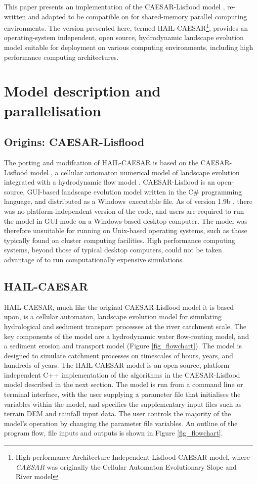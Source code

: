 This paper presents an implementation of the CAESAR-Lisflood model \citep{Coulthard2013}, re-written and adapted to be compatible on for shared-memory parallel computing environments. The version presented here, termed HAIL-CAESAR\footnote{High-performance Architecture Independent Lisflood-CAESAR model, where \textit{CAESAR} was originally the Cellular Automaton Evolutionary Slope and River model}, provides an operating-system independent, open source, hydrodynamic landscape evolution model suitable for deployment on various computing environments, including high performance computing architectures.


\section{Model description and parallelisation}

\subsection{Origins: CAESAR-Lisflood}
The porting and modifcation of HAIL-CAESAR is based on the CAESAR-Lisflood model \citep{Coulthard2013}, a cellular automaton numerical model of landscape evolution integrated with a hydrodynamic flow model \citep{bates2010simple}. CAESAR-Lisflood is an open-source, GUI-based landscape evolution model written in the C\# programming language, and distributed as a  Windows\texttrademark  \ executable file. As of version 1.9b \citep{coulthard2017caesarlisflood}, there was no platform-independent version of the code, and users are required to run the model in GUI-mode on a Windows-based desktop computer. The model was therefore unsuitable for running on Unix-based operating systems, such as those typically found on cluster computing facilities. High performance computing systems, beyond those of typical desktop computers, could not be taken advantage of to run computationally expensive simulations. 

\subsection{HAIL-CAESAR}

HAIL-CAESAR, much like the original CAESAR-Lisflood model it is based upon, is a cellular automaton, landscape evolution model for simulating hydrological and sediment transport processes at the river catchment scale. The key components of the model are a hydrodynamic water flow-routing model, and a sediment erosion and transport model (Figure \ref{fig_flowchart}). The model is designed to simulate catchment processes on timescales of hours, years, and hundreds of years. The HAIL-CAESAR model is an open source, platform-independent C++ implementation of the algorithms in the CAESAR-Lisflood model described in the next section. The model is run from a command line or terminal interface, with the user supplying a parameter file that initialises the variables within the model, and specifies the supplementary input files such as terrain DEM and rainfall input data. The user controls the majority of the model's operation by changing the parameter file variables. An outline of the program flow, file inputs and outputs is shown in Figure \ref{fig_flowchart}.

